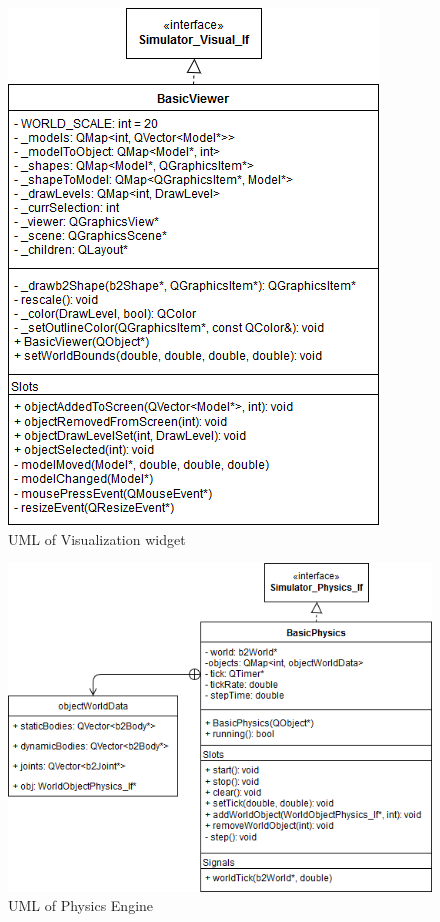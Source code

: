  \begin{figure}
 	\begin{center}
 	\includegraphics[scale=0.5]{./images_design/uml/BasicViewer}
 	\caption{UML of Visualization widget\label{uml:viewwidget}}
 	\end{center}
 \end{figure}
 
 \begin{figure}
 	\begin{center}
 	\includegraphics[scale=0.5]{./images_design/uml/BasicPhysics}
 	\caption{UML of Physics Engine\label{uml:physics}}
 	\end{center}
 \end{figure}
 
